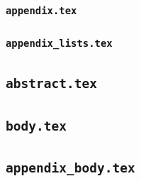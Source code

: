 \subsubsection{\texttt{appendix.tex}}
\label{sec:appendix.tex}

\subsubsection{\texttt{appendix\_lists.tex}}
\label{sec:appendix_lists.tex}

\subsection{\texttt{abstract.tex}}
\label{sec:abstract.tex}

\subsection{\texttt{body.tex}}
\label{sec:body.tex}

\subsection{\texttt{appendix\_body.tex}}
\label{appendix_body.tex}

